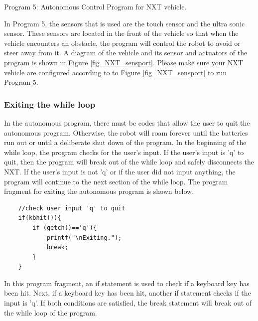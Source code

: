 \documentclass[12pt]{article}
\begin{document}

\begin{center}
Program 5: Autonomous Control Program for NXT vehicle.
\end{center}
In Program 5, the sensors that is used are the touch sensor and the ultra sonic sensor.
These sensors are located in the front of the vehicle so that when the vehicle encounters an obstacle, the program will
    control the robot to avoid or steer away from it.
A diagram of the vehicle and its sensor and actuators of the program is shown in Figure \ref{fig_NXT_sensport}.
Please make sure your NXT vehicle are configured according to to Figure \ref{fig_NXT_sensport} to run Program 5.

\subsubsection*{Exiting the while loop}
In the autonomous program, there must be codes that allow the user to quit the autonomous program.
Otherwise, the robot will roam forever until the batteries run out or until a deliberate shut down of the program.
In the beginning of the while loop, the program checks for the user's input. 
If the user's input is 'q' to quit, then the program will break out of the while loop and safely disconnects the NXT.
If the user's input is not 'q' or if the user did not input anything, the program will continue to the next section of
    the while loop.
The program fragment for exiting the autonomous program is shown below.
\begin{verbatim}
    //check user input 'q' to quit
    if(kbhit()){
        if (getch()=='q'){	
            printf("\nExiting.");
            break;
        }
    }
\end{verbatim}
In this program fragment, an if statement is used to check if a keyboard key has been hit.
Next, if a keyboard key has been hit, another if statement checks if the input is 'q'.
If both conditions are satisfied, the break statement will break out of the while loop of the program.
\end{document}
